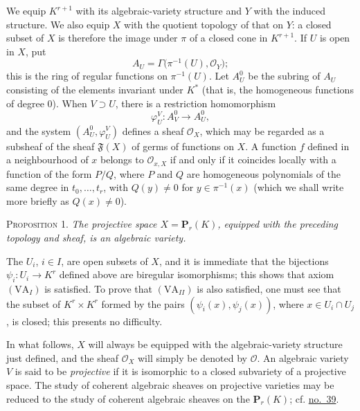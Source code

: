 \label{fac:III:1:no:51:construction:structure-sheaf}
We equip $K^{r+1}$ with its algebraic-variety structure and $Y$ with the
induced structure. We also equip $X$ with the quotient topology of that on
$Y$: a closed subset of $X$ is therefore the image under $\pi$ of a closed
cone in $K^{r+1}$. If $U$ is open in $X$, put
\[
A_U=\Gamma\bigl(\pi^{-1}(U),\mathcal{O}_Y\bigr);
\]
this is the ring of regular functions on $\pi^{-1}(U)$. Let $A_U^0$ be the
subring of $A_U$ consisting of the elements invariant under $K^*$ (that is,
the homogeneous functions of degree $0$). When $V\supset U$, there is a
restriction homomorphism
\[
\varphi_U^V:A_V^0\longrightarrow A_U^0,
\]
and the system $(A_U^0,\varphi_U^V)$ defines a sheaf $\mathcal{O}_X$, which
may be regarded as a subsheaf of the sheaf $\mathfrak{F}(X)$ of germs of
functions on $X$. A function $f$ defined in a neighbourhood of $x$ belongs
to $\mathcal{O}_{x,X}$ if and only if it coincides locally with a function of
the form $P/Q$, where $P$ and $Q$ are homogeneous polynomials of the same
degree in $t_0,\ldots,t_r$, with $Q(y)\neq0$ for
$y\in\pi^{-1}(x)$ (which we shall write more briefly as $Q(x)\neq0$).

\label{fac:III:1:prop:1}
\textsc{Proposition 1.}
\textit{The projective space $X=\mathbf{P}_r(K)$, equipped with the preceding
topology and sheaf, is an algebraic variety.}

The $U_i$, $i\in I$, are open subsets of $X$, and it is immediate that the
bijections $\psi_i:U_i\to K^r$ defined above are biregular isomorphisms; this
shows that axiom $(\mathrm{VA}_I)$ is satisfied. To prove that
$(\mathrm{VA}_{II})$ is also satisfied, one must see that the subset of
$K^r\times K^r$ formed by the pairs
$(\psi_i(x),\psi_j(x))$, where $x\in U_i\cap U_j$, is closed; this presents
no difficulty.

\label{fac:III:1:no:51:def:projective-variety}
In what follows, $X$ will always be equipped with the algebraic-variety
structure just defined, and the sheaf $\mathcal{O}_X$ will simply be denoted
by $\mathcal{O}$. An algebraic variety $V$ is said to be
\textit{projective} if it is isomorphic to a closed subvariety of a
projective space. The study of coherent algebraic sheaves on projective
varieties may be reduced to the study of coherent algebraic sheaves on the
$\mathbf{P}_r(K)$; cf. \hyperref[fac:II:2:no:39]{no.~39}.
